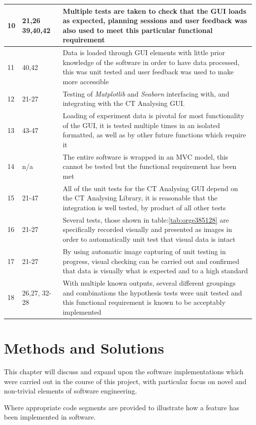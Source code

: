 \documentclass[11pt]{report}
\begin{document}
\begin{longtable}{|l|l|p{14cm}|}
\hline
10 & 21,26 39,40,42 & Multiple tests are taken to check that the GUI loads as expected, planning sessions and user feedback was also used to meet this particular functional requirement\\
\hline
11 & 40,42 & Data is loaded through GUI elements with little prior knowledge of the software in order to have data processed, this was unit tested and user feedback was used to make more accessible\\
\hline
12 & 21-27 & Testing of \emph{Matplotlib} and \emph{Seaborn} interfacing with, and integrating with the CT Analysing GUI.\\
\hline
13 & 43-47 & Loading of experiment data is pivotal for most functionality of the GUI, it is tested multiple times in an isolated formatted, as well as by other future functions which require it\\
\hline
14 & n/a & The entire software is wrapped in an MVC model, this cannot be tested but the functional requirement has been met\\
\hline
15 & 21-47 & All of the unit tests for the CT Analysing GUI depend on the CT Analysing Library, it is reasonable that the integration is well tested, by product of all other tests\\
\hline
16 & 21-27 & Several tests, those shown in table:\ref{tab:orge385128} are specifically recorded visually and presented as images in order to automatically unit test that visual data is intact\\
\hline
17 & 21-27 & By using automatic image capturing of unit testing in progress, visual checking can be carried out and confirmed that data is visually what is expected and to a high standard\\
\hline
18 & 26,27, 32-28 & With multiple known outputs, several different groupings and combinations the hypothesis tests were unit tested and this functional requirement is known to be acceptably implemented\\
\hline
\end{longtable}

\chapter{Methods and Solutions}
\label{sec:org3bb19d1}
This chapter will discuss and expand upon the software implementations which were carried out in the course of this project, with particular focus on novel and non-trivial elements of software engineering.

Where appropriate code segments are provided to illustrate how a feature has been implemented in software.
\end{document}
